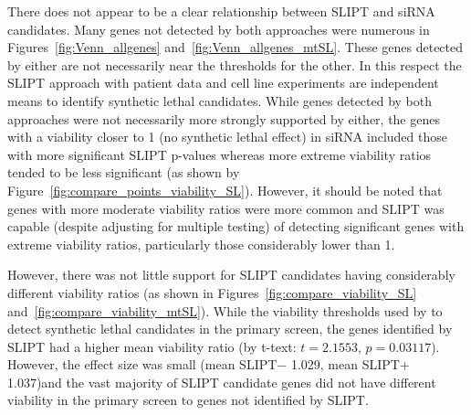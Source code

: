 There does not appear to be a clear relationship between \gls{SLIPT} and \gls{siRNA} candidates. Many genes not detected by both approaches were numerous in Figures~\ref{fig:Venn_allgenes} and~\ref{fig:Venn_allgenes_mtSL}. These genes detected by either are not necessarily near the thresholds for the other. In this respect the \gls{SLIPT} approach with patient data and cell line experiments are independent means to identify synthetic lethal candidates. While genes detected by both approaches were not necessarily more strongly supported by either, the genes with a viability closer to 1 (no synthetic lethal effect) in \gls{siRNA} included those with more significant \gls{SLIPT} p-values whereas more extreme viability ratios tended to be less significant (as shown by Figure~\ref{fig:compare_points_viability_SL}). However, it should be noted that genes with more moderate viability ratios were more common and \gls{SLIPT} was capable (despite adjusting for multiple testing) of detecting significant genes with extreme viability ratios, particularly those considerably lower than 1. 

However, there was not little support for \gls{SLIPT} candidates having considerably different viability ratios (as shown in Figures~\ref{fig:compare_viability_SL} and~\ref{fig:compare_viability_mtSL}). While the viability thresholds used by \citet{Telford2015} to detect synthetic lethal candidates in the primary screen, the genes identified by \gls{SLIPT} had a higher mean viability ratio (by t-text: $t=2.1553$, $p=0.03117$). However, the effect size was small (mean SLIPT$-$ 1.029, mean SLIPT$+$ 1.037)and the vast majority of \gls{SLIPT} candidate genes did not have different viability in the primary screen to genes not identified by \gls{SLIPT}.

